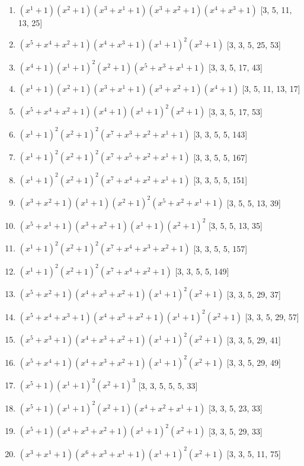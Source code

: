 \documentclass[10pt,twocolumn]{article}
\begin{document}
\begin{enumerate}
\item $(x^{1} + 1)(x^{2} + 1)(x^{3} + x^{1} + 1)(x^{3} + x^{2} + 1)(x^{4} + x^{3} + 1)$  [3, 5, 11, 13, 25]
\item $(x^{5} + x^{4} + x^{2} + 1)(x^{4} + x^{3} + 1)(x^{1} + 1)^{2}(x^{2} + 1)$  [3, 3, 5, 25, 53]
\item $(x^{4} + 1)(x^{1} + 1)^{2}(x^{2} + 1)(x^{5} + x^{3} + x^{1} + 1)$  [3, 3, 5, 17, 43]
\item $(x^{1} + 1)(x^{2} + 1)(x^{3} + x^{1} + 1)(x^{3} + x^{2} + 1)(x^{4} + 1)$  [3, 5, 11, 13, 17]
\item $(x^{5} + x^{4} + x^{2} + 1)(x^{4} + 1)(x^{1} + 1)^{2}(x^{2} + 1)$  [3, 3, 5, 17, 53]
\item $(x^{1} + 1)^{2}(x^{2} + 1)^{2}(x^{7} + x^{3} + x^{2} + x^{1} + 1)$  [3, 3, 5, 5, 143]
\item $(x^{1} + 1)^{2}(x^{2} + 1)^{2}(x^{7} + x^{5} + x^{2} + x^{1} + 1)$  [3, 3, 5, 5, 167]
\item $(x^{1} + 1)^{2}(x^{2} + 1)^{2}(x^{7} + x^{4} + x^{2} + x^{1} + 1)$  [3, 3, 5, 5, 151]
\item $(x^{3} + x^{2} + 1)(x^{1} + 1)(x^{2} + 1)^{2}(x^{5} + x^{2} + x^{1} + 1)$  [3, 5, 5, 13, 39]
\item $(x^{5} + x^{1} + 1)(x^{3} + x^{2} + 1)(x^{1} + 1)(x^{2} + 1)^{2}$  [3, 5, 5, 13, 35]
\item $(x^{1} + 1)^{2}(x^{2} + 1)^{2}(x^{7} + x^{4} + x^{3} + x^{2} + 1)$  [3, 3, 5, 5, 157]
\item $(x^{1} + 1)^{2}(x^{2} + 1)^{2}(x^{7} + x^{4} + x^{2} + 1)$  [3, 3, 5, 5, 149]
\item $(x^{5} + x^{2} + 1)(x^{4} + x^{3} + x^{2} + 1)(x^{1} + 1)^{2}(x^{2} + 1)$  [3, 3, 5, 29, 37]
\item $(x^{5} + x^{4} + x^{3} + 1)(x^{4} + x^{3} + x^{2} + 1)(x^{1} + 1)^{2}(x^{2} + 1)$  [3, 3, 5, 29, 57]
\item $(x^{5} + x^{3} + 1)(x^{4} + x^{3} + x^{2} + 1)(x^{1} + 1)^{2}(x^{2} + 1)$  [3, 3, 5, 29, 41]
\item $(x^{5} + x^{4} + 1)(x^{4} + x^{3} + x^{2} + 1)(x^{1} + 1)^{2}(x^{2} + 1)$  [3, 3, 5, 29, 49]
\item $(x^{5} + 1)(x^{1} + 1)^{2}(x^{2} + 1)^{3}$  [3, 3, 5, 5, 5, 33]
\item $(x^{5} + 1)(x^{1} + 1)^{2}(x^{2} + 1)(x^{4} + x^{2} + x^{1} + 1)$  [3, 3, 5, 23, 33]
\item $(x^{5} + 1)(x^{4} + x^{3} + x^{2} + 1)(x^{1} + 1)^{2}(x^{2} + 1)$  [3, 3, 5, 29, 33]
\item $(x^{3} + x^{1} + 1)(x^{6} + x^{3} + x^{1} + 1)(x^{1} + 1)^{2}(x^{2} + 1)$  [3, 3, 5, 11, 75]

\end{enumerate}
\end{document}
